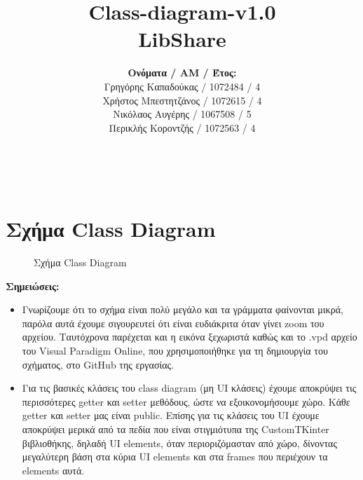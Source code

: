 \documentclass[12pt,a4paper]{article}
\title{Class-diagram-v1.0 \\ LibShare}
\author{\textbf{Ονόματα / ΑΜ / Έτος:} \\ Γρηγόρης Καπαδούκας / 1072484 / 4\textdegree \\ Χρήστος Μπεστητζάνος / 1072615 / 4\textdegree \\ Νικόλαος Αυγέρης / 1067508 / 5\textdegree \\ Περικλής Κοροντζής / 1072563 / 4\textdegree}
\begin{document}
\makeatletter
\begin{center}
	\LARGE{\@title} \\
	\pagebreak
    \begin{LARGE}\@author\end{LARGE} 
    \pagebreak
\end{center}

\section{Σχήμα Class Diagram}

\begin{figure}[H]
	\caption{Σχήμα Class Diagram}
	\label{Σχήμα Class Diagram}
\end{figure}

\textbf{Σημειώσεις:}
\begin{itemize}
    \item Γνωρίζουμε ότι το σχήμα είναι πολύ μεγάλο και τα γράμματα φαίνονται μικρά, παρόλα αυτά έχουμε σιγουρευτεί ότι είναι ευδιάκριτα όταν γίνει zoom του αρχείου. Ταυτόχρονα παρέχεται και η εικόνα ξεχωριστά καθώς και το .vpd αρχείο του Visual Paradigm Online, που χρησιμοποιήθηκε για τη δημιουργία του σχήματος, στο GitHub της εργασίας.
    \item Για τις βασικές κλάσεις του class diagram (μη UI κλάσεις) έχουμε αποκρύψει τις περισσότερες getter και setter μεθόδους, ώστε να εξοικονομήσουμε χώρο. Κάθε getter και setter μας είναι public. Επίσης για τις κλάσεις του UI έχουμε αποκρύψει μερικά από τα πεδία που είναι στιγμιότυπα της CustomTKinter βιβλιοθήκης, δηλαδή UI elements, όταν περιοριζόμασταν από χώρο, δίνοντας μεγαλύτερη βάση στα κύρια UI elements και στα frames που περιέχουν τα elements αυτά.
\end{itemize}
\end{document}
